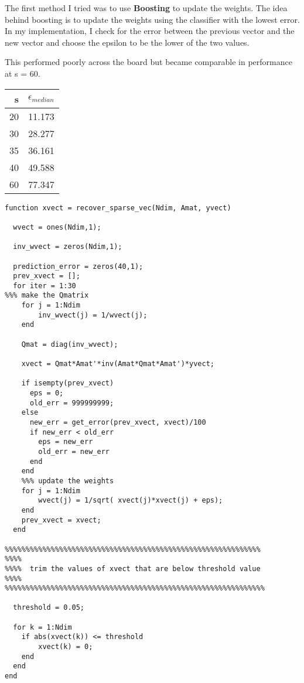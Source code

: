 \documentclass[11pt]{article}
\begin{document}
The first method I tried was to use \textbf{Boosting} to update the weights. The idea
behind boosting is to update the weights using the classifier with the lowest
error. In my implementation, I check for the error between the previous vector
and the new vector and choose the epsilon to be the lower of the two values.

This performed poorly across the board but became comparable in performance at s
= 60.

\begin{center}
\begin{tabular}{rr}
s & \(\epsilon_{median}\)\\
\hline
20 & 11.173\\
30 & 28.277\\
35 & 36.161\\
40 & 49.588\\
60 & 77.347\\
\end{tabular}
\end{center}

\begin{verbatim}
function xvect = recover_sparse_vec(Ndim, Amat, yvect)

  wvect = ones(Ndim,1);

  inv_wvect = zeros(Ndim,1);

  prediction_error = zeros(40,1);
  prev_xvect = [];
  for iter = 1:30
%%% make the Qmatrix
    for j = 1:Ndim
        inv_wvect(j) = 1/wvect(j);
    end

    Qmat = diag(inv_wvect);

    xvect = Qmat*Amat'*inv(Amat*Qmat*Amat')*yvect;

    if isempty(prev_xvect)
      eps = 0;
      old_err = 999999999;
    else
      new_err = get_error(prev_xvect, xvect)/100
      if new_err < old_err
        eps = new_err
        old_err = new_err
      end
    end
    %%% update the weights
    for j = 1:Ndim
        wvect(j) = 1/sqrt( xvect(j)*xvect(j) + eps);
    end
    prev_xvect = xvect;
  end

%%%%%%%%%%%%%%%%%%%%%%%%%%%%%%%%%%%%%%%%%%%%%%%%%%%%%%%%%%%%%
%%%%
%%%%  trim the values of xvect that are below threshold value
%%%%
%%%%%%%%%%%%%%%%%%%%%%%%%%%%%%%%%%%%%%%%%%%%%%%%%%%%%%%%%%%%%%

  threshold = 0.05;

  for k = 1:Ndim
    if abs(xvect(k)) <= threshold
        xvect(k) = 0;
    end
  end
end
\end{verbatim}
\end{document}
